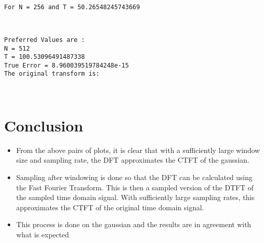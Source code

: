 \documentclass[11pt]{article}
\providecommand{\tightlist}{%
      \setlength{\itemsep}{0pt}\setlength{\parskip}{0pt}}
\begin{document}
    \begin{center}
    \end{center}
    { \hspace*{\fill} \\}
    
    \begin{Verbatim}[commandchars=\\\{\}]
For N = 256 and T = 50.26548245743669

    \end{Verbatim}

    \begin{center}
    \end{center}
    { \hspace*{\fill} \\}
    
    \begin{Verbatim}[commandchars=\\\{\}]
Preferred Values are :
N = 512
T = 100.53096491487338
True Error = 8.960039519784248e-15
The original transform is:

    \end{Verbatim}

    \begin{center}
    \end{center}
    { \hspace*{\fill} \\}
    
    \hypertarget{conclusion}{%
\section{Conclusion}\label{conclusion}}

\begin{itemize}
\tightlist
\item
  From the above pairs of plots, it is clear that with a sufficiently
  large window size and sampling rate, the DFT approximates the CTFT of
  the gaussian.
\item
  Sampling after windowing is done so that the DFT can be calculated
  using the Fast Fourier Transform. This is then a sampled version of
  the DTFT of the sampled time domain signal. With sufficiently large
  sampling rates, this approximates the CTFT of the original time domain
  signal.
\item
  This process is done on the gaussian and the results are in agreement
  with what is expected
\end{itemize}


    
    
    
    
\end{document}

